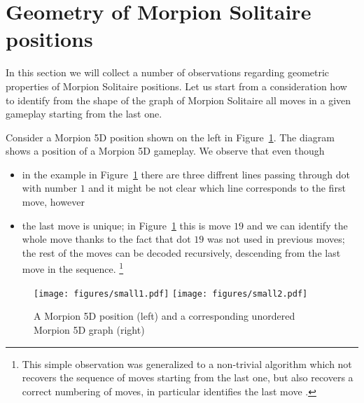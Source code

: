 \section{Geometry of Morpion Solitaire positions}

In this section we will collect a number of observations regarding geometric properties of Morpion Solitaire positions. Let us start 
from a consideration how to identify from the shape of the graph of Morpion Solitaire all moves in a given gameplay starting from the last one. 

\begin{example}
Consider a Morpion 5D position shown on the left in Figure~\ref{fig:small}. 
The diagram shows a position of a Morpion 5D gameplay.
We observe that %
  even though 
  \begin{itemize}
    \item   in the example in Figure~\ref{fig:small} there are three diffrent lines passing through dot with number $1$ and it might be not clear which line corresponds to the first move, however
    \item   the last move is unique; in Figure~\ref{fig:small} this is move $19$ and we can identify the whole move thanks to the fact  that dot $19$ was not used in previous moves; the rest of the moves can be decoded recursively, descending from the last move in the sequence. \footnote{This simple observation was generalized to a non-trivial algorithm which not recovers the sequence of moves starting from the last one, but also recovers a correct numbering of moves, in particular identifies the last move \cite{demaine}.} %
  \end{itemize}
\end{example}


\begin{figure}
    \texttt{[image: figures/small1.pdf]}
    \texttt{[image: figures/small2.pdf]}
    \caption{\label{fig:small}
      A Morpion 5D position (left) and a corresponding unordered Morpion 5D graph (right)
    }
\end{figure}

